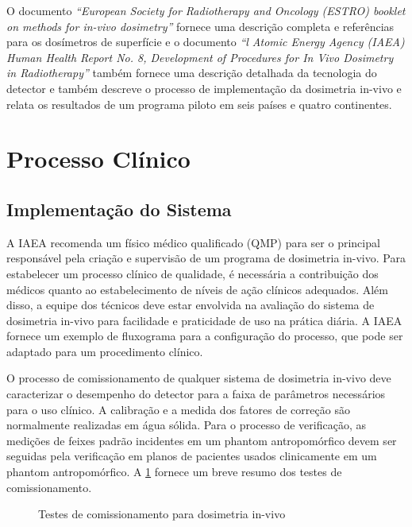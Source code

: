 \documentclass[11pt,a4paper]{article}
\newcounter{exemplo}
\begin{document}
	O documento \textit{``European Society for Radiotherapy and Oncology (ESTRO) booklet on methods for in-vivo dosimetry''} fornece uma descrição completa e referências para os dosímetros de superfície e o documento \textit{``l Atomic Energy Agency (IAEA) Human Health Report No. 8, Development of Procedures for In Vivo Dosimetry in Radiotherapy''} também fornece uma descrição detalhada da tecnologia do detector e também descreve o processo de implementação da dosimetria in-vivo e relata os resultados de um programa piloto em seis países e quatro continentes.


\section{Processo Clínico}

\subsection{Implementação do Sistema}

	A IAEA recomenda um físico médico qualificado (QMP) para ser o principal responsável pela criação e supervisão de um programa de dosimetria in-vivo. Para estabelecer um processo clínico de qualidade, é necessária a contribuição dos médicos quanto ao estabelecimento de níveis de ação clínicos adequados. Além disso, a equipe dos técnicos deve estar envolvida na avaliação do sistema de dosimetria in-vivo para facilidade e praticidade de uso na prática  diária. A IAEA fornece um exemplo de fluxograma para a configuração do processo, que pode ser adaptado para um procedimento clínico.

	O processo de comissionamento de qualquer sistema de dosimetria in-vivo deve caracterizar o desempenho do detector para a faixa de parâmetros necessários para o uso clínico. A 
	calibração e a medida dos fatores de correção são normalmente realizadas em água sólida. Para o processo de verificação, as medições de feixes padrão incidentes em um phantom  antropomórfico devem ser seguidas pela verificação em planos de pacientes usados clinicamente em um phantom antropomórfico. A \ref{fig:medidasDosimetrosInVivo} fornece um breve resumo dos testes de comissionamento.

	\begin{figure}[h]
		\centering
		\caption{Testes de comissionamento para dosimetria in-vivo}
		\label{fig:medidasDosimetrosInVivo}
	\end{figure}
\end{document}
